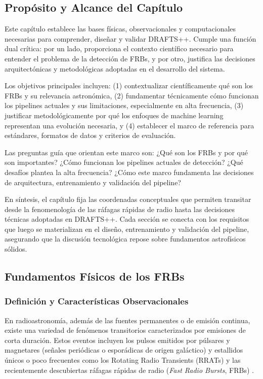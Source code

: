 
\subsection{Propósito y Alcance del Capítulo}

Este capítulo establece las bases físicas, observacionales y computacionales necesarias para comprender, diseñar y validar DRAFTS++. Cumple una función dual crítica: por un lado, proporciona el contexto científico necesario para entender el problema de la detección de FRBs, y por otro, justifica las decisiones arquitectónicas y metodológicas adoptadas en el desarrollo del sistema.

Los objetivos principales incluyen: (1) contextualizar científicamente qué son los FRBs y su relevancia astronómica, (2) fundamentar técnicamente cómo funcionan los pipelines actuales y sus limitaciones, especialmente en alta frecuencia, (3) justificar metodológicamente por qué los enfoques de machine learning representan una evolución necesaria, y (4) establecer el marco de referencia para estándares, formatos de datos y criterios de evaluación.

Las preguntas guía que orientan este marco son: ¿Qué son los FRBs y por qué son importantes? ¿Cómo funcionan los pipelines actuales de detección? ¿Qué desafíos plantea la alta frecuencia? ¿Cómo este marco fundamenta las decisiones de arquitectura, entrenamiento y validación del pipeline?

En síntesis, el capítulo fija las coordenadas conceptuales que permiten transitar desde la fenomenología de las ráfagas rápidas de radio hasta las decisiones técnicas adoptadas en DRAFTS++. Cada sección se conecta con los requisitos que luego se materializan en el diseño, entrenamiento y validación del pipeline, asegurando que la discusión tecnológica repose sobre fundamentos astrofísicos sólidos.

\subsection{Fundamentos Físicos de los FRBs}

\subsubsection{Definición y Características Observacionales}

En radioastronomía, además de las fuentes permanentes o de emisión continua, existe una variedad de fenómenos transitorios caracterizados por emisiones de corta duración. Estos eventos incluyen los pulsos emitidos por púlsares y magnetares (señales periódicas o esporádicas de origen galáctico) y estallidos únicos o poco frecuentes como los Rotating Radio Transients (RRATs) y las recientemente descubiertas ráfagas rápidas de radio (\textit{Fast Radio Bursts}, FRBs) \citep{Petroff_2022}.

